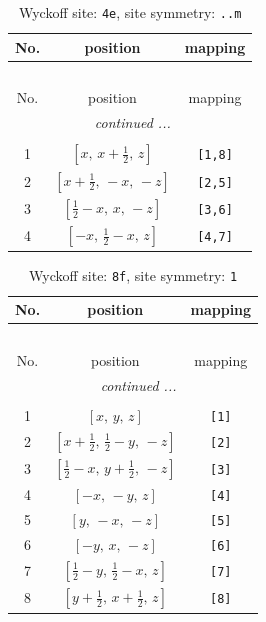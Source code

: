\documentclass[fleqn,8pt]{jsarticle}
\begin{document}
\begin{longtable}{ccc}
\caption{Wyckoff site: {\tt 4e}, site symmetry: {\tt ..m}}
 \\
 \hline \hline
No. & position & mapping \\ \hline \endfirsthead

\multicolumn{2}{l}{\tablename\ \thetable{}} \\
 \hline \hline
No. & position & mapping \\ \hline \endhead

 \hline \hline
\multicolumn{2}{r}{\footnotesize\it continued ...} \\ \endfoot

 \hline \hline
\multicolumn{2}{r}{} \\ \endlastfoot

1 & $\left[ x,\, x + \frac{1}{2},\, z \right]$ & {\tt [1,8]} \\ \hline
2 & $\left[ x + \frac{1}{2},\, - x,\, - z \right]$ & {\tt [2,5]} \\ \hline
3 & $\left[ \frac{1}{2} - x,\, x,\, - z \right]$ & {\tt [3,6]} \\ \hline
4 & $\left[ - x,\, \frac{1}{2} - x,\, z \right]$ & {\tt [4,7]} \\
\end{longtable}
\renewcommand{\arraystretch}{1.2}
\begin{longtable}{ccc}
\caption{Wyckoff site: {\tt 8f}, site symmetry: {\tt 1}}
 \\
 \hline \hline
No. & position & mapping \\ \hline \endfirsthead

\multicolumn{2}{l}{\tablename\ \thetable{}} \\
 \hline \hline
No. & position & mapping \\ \hline \endhead

 \hline \hline
\multicolumn{2}{r}{\footnotesize\it continued ...} \\ \endfoot

 \hline \hline
\multicolumn{2}{r}{} \\ \endlastfoot

1 & $\left[ x,\, y,\, z \right]$ & {\tt [1]} \\ \hline
2 & $\left[ x + \frac{1}{2},\, \frac{1}{2} - y,\, - z \right]$ & {\tt [2]} \\ \hline
3 & $\left[ \frac{1}{2} - x,\, y + \frac{1}{2},\, - z \right]$ & {\tt [3]} \\ \hline
4 & $\left[ - x,\, - y,\, z \right]$ & {\tt [4]} \\ \hline
5 & $\left[ y,\, - x,\, - z \right]$ & {\tt [5]} \\ \hline
6 & $\left[ - y,\, x,\, - z \right]$ & {\tt [6]} \\ \hline
7 & $\left[ \frac{1}{2} - y,\, \frac{1}{2} - x,\, z \right]$ & {\tt [7]} \\ \hline
8 & $\left[ y + \frac{1}{2},\, x + \frac{1}{2},\, z \right]$ & {\tt [8]} \\
\end{longtable}
\end{document}
